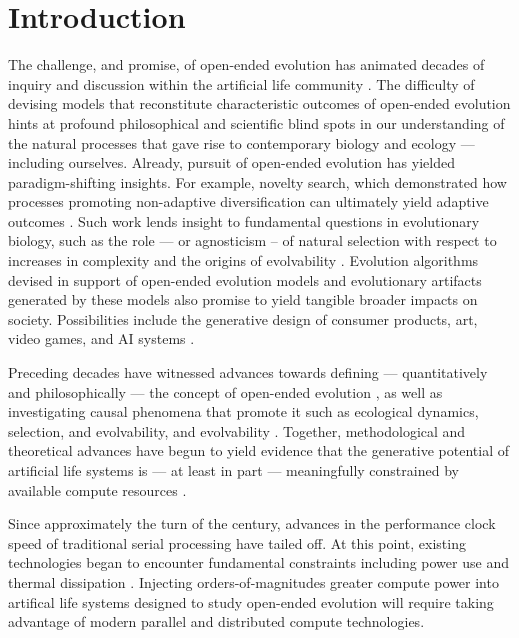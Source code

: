 \section{Introduction}

The challenge, and promise, of open-ended evolution has animated decades of inquiry and discussion within the artificial life community \citep{packard2019overview}.
The difficulty of devising models that reconstitute characteristic outcomes of open-ended evolution hints at profound philosophical and scientific blind spots in our understanding of the natural processes that gave rise to contemporary biology and ecology --- including ourselves.
Already, pursuit of open-ended evolution has yielded paradigm-shifting insights.
For example, novelty search, which demonstrated how processes promoting non-adaptive diversification can ultimately yield adaptive outcomes \citep{lehman2011abandoning}.
Such work lends insight to fundamental questions in evolutionary biology, such as the role --- or agnosticism -- of natural selection with respect to increases in complexity \citep{lehman2012evolution, lynch2007frailty} and the origins of evolvability \citep{lehman2013evolvability, kirschner1998evolvability}.
Evolution algorithms devised in support of open-ended evolution models and evolutionary artifacts generated by these models also promise to yield tangible broader impacts on society.
Possibilities include the generative design of consumer products, art, video games, and AI systems \citep{nguyen2015innovation, stanley2017open}.

Preceding decades have witnessed advances towards defining --- quantitatively and philosophically --- the concept of open-ended evolution \citep{lehman2012beyond, dolson2019modes, bedau1998classification}, as well as investigating causal phenomena that promote it such as ecological dynamics, selection, and evolvability, and evolvability \citep{dolson2019constructive, soros2014identifying, huizinga2018emergence}.
Together, methodological and theoretical advances have begun to yield evidence that the generative potential of artificial life systems is --- at least in part --- meaningfully constrained by available compute resources \citep{channon2019maximum}.

Since approximately the turn of the century, advances in the performance clock speed of traditional serial processing have tailed off.
At this point, existing technologies began to encounter fundamental constraints including power use and thermal dissipation \citep{sutter2005free}.
Injecting orders-of-magnitudes greater compute power into artifical life systems designed to study open-ended evolution will require taking advantage of modern parallel and distributed compute technologies.

